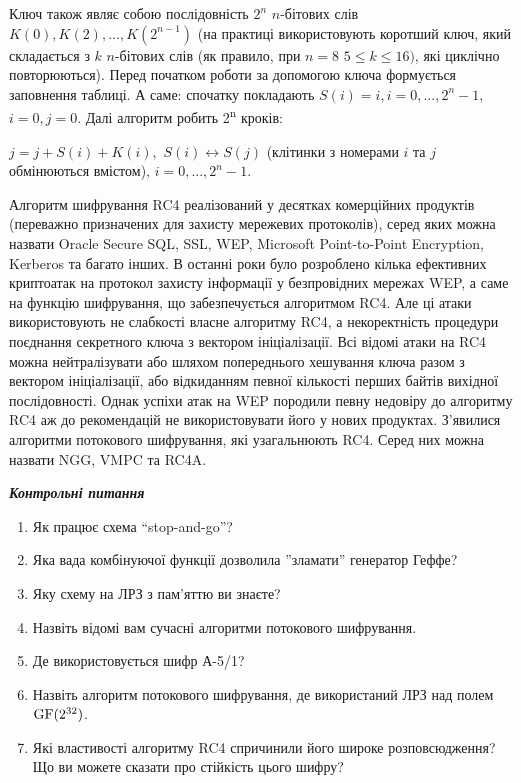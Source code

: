 \documentclass[a4paper]{article}
\newcommand\liststyleWWviiiNumxxiv{%
\renewcommand\theenumi{\arabic{enumi}}
\renewcommand\theenumii{\alph{enumii}}
\renewcommand\theenumiii{\roman{enumiii}}
\renewcommand\theenumiv{\arabic{enumiv}}
\renewcommand\labelenumi{\theenumi.}
\renewcommand\labelenumii{\theenumii.}
\renewcommand\labelenumiii{\theenumiii.}
\renewcommand\labelenumiv{\theenumiv.}
}
\newcounter{}
\newcommand\normalsubformula[1]{\text{\mathversion{normal}$#1$}}
\begin{document}
Ключ також  являє собою послідовність  ${2^{{n}}}$   ${n}${}-бітових слів 
${K(0),K(2),\text{.}\text{.}\text{.},K(2^{{n-1}})}$ (на практиці використовують
коротший ключ, який складається з  ${k}$ ${n}${}-бітових слів (як правило, при 
${n=8}$  ${5\le k\le \text{16})}$, які циклічно повторюються). Перед початком
роботи за допомогою ключа формується заповнення таблиці. А саме: спочатку
покладають  ${S(i)=i,i=0,\text{.}\text{.}\text{.},2^{{n}}-1,}$  ${i=0,j=0}$.
Далі алгоритм робить 2\textsuperscript{n} кроків: 

 ${j=j+S(i)+K(i),}$   ${S(i)\leftrightarrow S(j)}$ (клітинки з номерами  ${i}$
та  ${j}$ обмінюються вмістом),  ${i=0,\text{.}\text{.}\text{.},2^{{n}}-1}$.

Алгоритм шифрування RC4 реалізований у  десятках комерційних продуктів
(переважно призначених для захисту мережевих протоколів), серед яких можна
назвати Oracle Secure SQL, SSL, WEP, Microsoft Point{}-to{}-Point Encryption,
Kerberos та багато інших. В останні роки було розроблено кілька ефективних
криптоатак на протокол захисту інформації у безпровідних мережах WEP, а саме на
функцію шифрування, що забезпечується алгоритмом RC4. Але ці атаки
використовують не слабкості власне  алгоритму RC4, а  некоректність процедури
поєднання секретного ключа з вектором  ініціалізації. Всі відомі атаки на RC4
можна нейтралізувати або шляхом попереднього хешування ключа разом з вектором
ініціалізації, або відкиданням певної кількості перших байтів вихідної
послідовності. Однак успіхи атак на  WEP породили певну недовіру до алгоритму
RC4 аж до рекомендацій не використовувати його у нових продуктах. З’явилися
алгоритми потокового шифрування, які узагальнюють  RC4. Серед них можна назвати
NGG, VMPC та RC4A.  


\bigskip


\bigskip


\bigskip


\bigskip

{\centering\bfseries\itshape
Контрольні питання
\par}


\bigskip


\bigskip

\liststyleWWviiiNumxxiv
\begin{enumerate}
\item Як працює схема “stop{}-and{}-go”?
\item Яка вада комбінуючої функції дозволила ”зламати” генератор Геффе?
\item Яку схему на ЛРЗ з пам’яттю ви знаєте?
\item Назвіть відомі вам сучасні алгоритми потокового шифрування.
\item Де використовується шифр А-5/1?
\item Назвіть алгоритм потокового шифрування, де використаний ЛРЗ над полем 
${\normalsubformula{\text{GF}}(2^{{\text{32}}})}$.
\item Які властивості алгоритму RC4 спричинили його широке розповсюдження? Що ви
можете сказати про стійкість цього шифру?
\end{enumerate}
\end{document}
